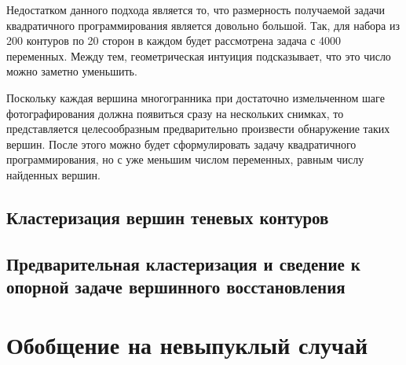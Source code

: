 \documentclass[a4paper, 12pt, titlepage]{article}
\theoremstyle{definition}
\theoremstyle{plain}
\theoremstyle{plain}
\begin{document}

Недостатком данного подхода является то, что размерность получаемой задачи
квадратичного программирования является довольно большой. Так, для набора из
200 контуров по 20 сторон в каждом будет рассмотрена задача с 4000
переменных. Между тем, геометрическая интуиция подсказывает, что это число
можно заметно уменьшить.

Поскольку каждая вершина многогранника при достаточно измельченном шаге
фотографирования должна появиться сразу на нескольких снимках, то
представляется целесообразным предварительно произвести обнаружение таких
вершин. После этого можно будет сформулировать задачу квадратичного
программирования, но с уже меньшим числом переменных, равным числу найденных
вершин.

\subsection{Кластеризация вершин теневых контуров}


\subsection{Предварительная кластеризация и сведение к опорной задаче
вершинного восстановления}




\section{Обобщение на невыпуклый случай}

\newpage


\end{document}
